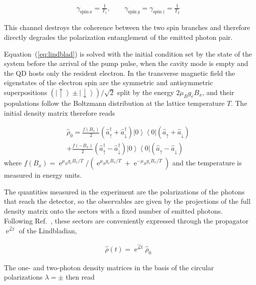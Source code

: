 \documentclass[prb,twocolumn,preprintnumbers,superscriptaddress]{revtex4-2}
\DeclareMathOperator{\e}{e}
\begin{document}
\begin{gather}
    \gamma_{\text{spin} \, x} = \frac{1}{T_1} , \qquad
    \gamma_{\text{spin} \, y} = \gamma_{\text{spin} \, z} = \frac{1}{T_2}
    \label{eq:spin-rates}
\end{gather}

This channel destroys the coherence between the two spin branches and therefore
directly degrades the polarization entanglement of the emitted photon pair.

Equation~(\ref{eq:lindblad}) is solved with the initial condition set by the state
of the system before the arrival of the pump pulse, when the cavity mode is empty
and the QD hosts only the resident electron.
In the transverse magnetic field the eigenstates of the electron spin are the
symmetric and antisymmetric superpositions
$( \left| \uparrow \right> \pm \left| \downarrow \right> ) / \sqrt{2}$
split by the energy $2 \mu_B g_e B_x$, and their populations follow the
Boltzmann distribution at the lattice temperature $T$.
The initial density matrix therefore reads

\begin{gather}
    \hat{\rho}_0 =
    \frac{f(B_x)}{2}
    \left(\hat{a}^{\dag}_{\uparrow} + \hat{a}^{\dag}_{\downarrow} \right)
    \left| 0 \right> \left< 0 \right|
    \left(\hat{a}_{\uparrow} + \hat{a}_{\downarrow} \right)
    \label{eq:rho0}
    \\ \nonumber
    + \frac{f(-B_x)}{2}
    \left(\hat{a}^{\dag}_{\uparrow} - \hat{a}^{\dag}_{\downarrow} \right)
    \left| 0 \right> \left< 0 \right|
    \left(\hat{a}_{\uparrow} - \hat{a}_{\downarrow} \right)
\end{gather}
where $f(B_x) = \e^{\mu_B g_e B_x / T}/ \left( \e^{\mu_B g_e B_x / T} + \e^{-\mu_B g_e B_x / T}  \right)$
and the temperature is measured in energy units.

The quantities measured in the experiment are the polarizations of the photons that
reach the detector, so the observables are given by the projections of the full
density matrix onto the sectors with a fixed number of emitted photons.
Following Ref.~\cite{Krainov}, these sectors are conveniently expressed through the
propagator $\e^{\hat{\mathcal{L}} t}$ of the Lindbladian,

\begin{gather}
    \hat{\rho}(t) = \e^{\hat{\mathcal{L}} t} \hat{\rho}_0
    \label{eq:propagator}
\end{gather}

The one- and two-photon density matrices in the basis of the circular polarizations
$\lambda = \pm$ then read
\end{document}
